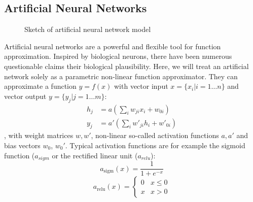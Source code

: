 	\subsection{Artificial Neural Networks}\label{sec:neuralnetworks}

		\begin{figure}[htp]
			\centering
			
			\caption{Sketch of artificial neural network model}
			\label{fig:overview}
		\end{figure}
		Artificial neural networks are a powerful and flexible tool for function approximation. Inspired by biological neurons, there have been numerous questionable claims \wrt their biological plausibility. %
		Here, we will treat an artificial network solely as a parametric non-linear function approximator. They can approximate a function $y = f(x)$ with vector input $x = \{ x_i | i = 1 \ldots n \}$ and vector output $y = \{ y_j | j = 1 \ldots m \}$:
		\begin{equation} \label{eq1}
			\begin{split}
				h_j & =  a (\sum_i w_{ji} x_i + w_{0i})  \\
				y_j & =  a' (\sum_i w'_{ji} h_i + w'_{0i})
			\end{split}
		\end{equation},
		with weight matrices $w, w'$, non-linear so-called activation functions $a, a'$  and bias vectors $w_{0}$, $w_{0}'$.
		Typical activation functions are for example the sigmoid function ($a_{sigm}$ or the rectified linear unit ($a_{relu}$):
		\begin{equation}
			a_{\textrm{sigm}}(x)= \frac{1}{1+e^{-x}}
		\end{equation}
		\begin{equation}
			a_{\textrm{relu}}(x)=
			\begin{cases}
			      0 & x\leq 0 \\
			      x & x > 0
			\end{cases}
		\end{equation}
